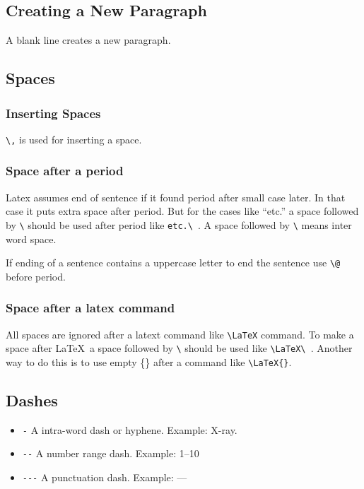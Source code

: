 \documentclass[11pt]{article}
\begin{document}
\subsection{Creating a New Paragraph}

A blank line creates a new paragraph.

\subsection{Spaces}

\subsubsection{Inserting Spaces}

\verb=\,= is used for inserting a space.

\subsubsection{Space after a period}

Latex assumes end of sentence if it found period after small case later. In that case it puts extra space after period. But for the cases like ``etc.'' a space followed by \verb=\= should be used after period like \verb=etc.\ =. A space followed by \verb=\=  means inter word space.

If ending of a sentence contains a uppercase letter to end the sentence use \verb=\@= before period.

\subsubsection{Space after a latex command}

All spaces are ignored after a latext command like \verb=\LaTeX= command. To make a space after \LaTeX\ a space followed by \verb=\= should be used like \verb=\LaTeX\ =. Another way to do this is
to use empty \{\} after a command like \verb=\LaTeX{}=.

\subsection{Dashes}

\begin{itemize}
		\item\verb=-= A intra-word dash or hyphene. Example: X-ray.
		\item\verb=--= A number range dash. Example: 1--10
		\item\verb=---= A punctuation dash. Example: ---
\end{itemize}
\end{document}
